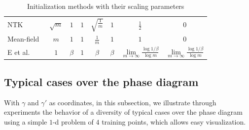 \documentclass{article}
\begin{document}
\begin{table}[ht]
\begin{tabularx}{\textwidth}{lccccccc}
        NTK~\scriptsize{\cite{jacot_neural_2018}}                                                 & $\sqrt{m}$                & $1$                        & $1$                        & $\sqrt{\frac{1}{m}}$                                & $1$                                           & $\frac{1}{2}$                                                             & $0$                                                                         \\
        Mean-field~\scriptsize{\cite{mei_mean_2018,sirignano_mean_2020,rotskoff_parameters_2018}} & $m$                       & $1$                        & $1$                        & $\frac{1}{m}$                                       & $1$                                           & $1$                                                                       & $0$                                                                         \\
        E et al.~\scriptsize{\cite{e2020comparative}}                                             & $1$                       & $\beta$                    & $1$                        & $\beta$                                             & $\beta$                                       & $\scriptscriptstyle\lim\limits_{m\to\infty}\frac{\log 1/\beta}{\log m}$   & $\scriptscriptstyle\lim\limits_{m\to\infty}\frac{\log 1/\beta}{\log m}$     \\
        \bottomrule
    \end{tabularx}
    \caption{Initialization methods with their scaling parameters}
    \label{tab..InitializationMethods}
\end{table}

\subsection{Typical cases over the phase diagram}

With $\gamma$ and $\gamma'$ as coordinates, in this subsection, we illustrate through experiments the behavior of a diversity of typical cases over the phase diagram using a simple $1$-d problem of $4$ training points, which allows easy visualization.
\end{document}
